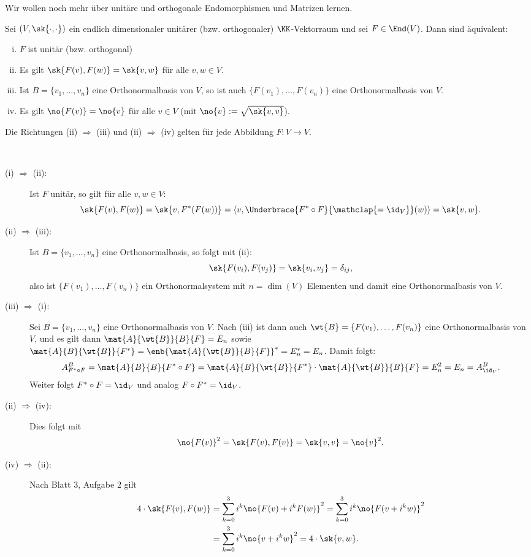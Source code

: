 Wir wollen noch mehr über unitäre und orthogonale Endomorphismen und Matrizen lernen.

\begin{satz}
	\label{satz:6.8}
	Sei $(V,\sk{\cdot,\cdot})$ ein endlich dimensionaler unitärer (bzw. orthogonaler) $\KK$-Vektorraum und sei $F \in \End(V)$.
	Dann sind äquivalent:
	\begin{enumerate}[(i)]
		\item $F$ ist unitär (bzw. orthogonal)
		\item Es gilt $\sk{F(v),F(w)} = \sk{v,w}$ für alle $v,w \in V$.
		\item Ist $B = \{v_1,\dots,v_n\}$ eine Orthonormalbasis von $V$, so ist auch $\{F(v_1),\dots,F(v_n)\}$ eine Orthonormalbasis von $V$.
		\item Es gilt $\no{F(v)} = \no{v}$ für alle $v \in V$ (mit $\no{v} := \sqrt{\sk{v,v}}$).
	\end{enumerate}
	Die Richtungen (ii) $\Rightarrow$ (iii) und (ii) $\Rightarrow$ (iv) gelten für jede Abbildung $F \colon V \rightarrow V$.
\end{satz}

\begin{beweis} \mbox{} \\[-.9cm]
	\begin{description}
		\item[(i) $\Rightarrow$ (ii):] Ist $F$ unitär, so gilt für alle $v,w \in V$:
		\[
			\sk{F(v),F(w)} = \sk{v,F^*(F(w))} = \langle v,\Underbrace{F^*\circ F}{\mathclap{=\id_V}}(w)\rangle = \sk{v,w}.
		\]
		\item[(ii) $\Rightarrow$ (iii):] Ist $B = \{v_1,\dots,v_n\}$ eine Orthonormalbasis, so folgt mit (ii):
		\[
			\sk{F(v_i),F(v_j)} = \sk{v_i,v_j} = \delta_{ij},
		\]
		also ist $\{F(v_1),\dots,F(v_n)\}$ ein Orthonormalsystem mit $n = \dim(V)$ Elementen und damit eine Orthonormalbasis von $V$.
		\item[(iii) $\Rightarrow$ (i):] Sei $B = \{v_1,\dots,v_n\}$ eine Orthonormalbasis von $V$.
		Nach (iii) ist dann auch $\wt{B} = \{F(v_1),\dots,F(v_n)\}$ eine Orthonormalbasis von $V$, und es gilt dann $\mat{A}{\wt{B}}{B}{F} = E_n$ sowie $\mat{A}{B}{\wt{B}}{F^*} = \enb{\mat{A}{\wt{B}}{B}{F}}^* = E_n^* = E_n$.
		Damit folgt:
		\[
			A^B_{F^* \circ F} = \mat{A}{B}{B}{F^* \circ F} = \mat{A}{B}{\wt{B}}{F^*} \cdot \mat{A}{\wt{B}}{B}{F} = E_n^2 = E_n = A^B_{\id_V}.
		\]
		Weiter folgt $F^* \circ F = \id_V$ und analog $F \circ F^* = \id_V$.
		\item[(ii) $\Rightarrow$ (iv):] Dies folgt mit
		\[
			\no{F(v)}^2 = \sk{F(v),F(v)} = \sk{v,v} = \no{v}^2.
		\]
		\item[(iv) $\Rightarrow$ (ii):] Nach Blatt 3, Aufgabe 2 gilt
		\begin{align*}
			4 \cdot \sk{F(v),F(w)} &= \sum_{k=0}^{3} i^k \no{F(v) + i^k F(w)}^2 
			= \sum_{k=0}^{3} i^k \no{F(v+i^kw)}^2 \\
			&= \sum_{k=0}^{3} i^k \no{v+i^kw}^2 = 4 \cdot \sk{v,w}. 
		\end{align*}
	\end{description}	
\end{beweis}

